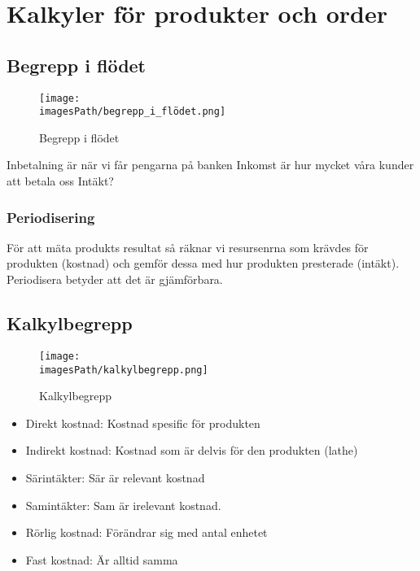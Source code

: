 \documentclass{article}
\newcommand{\imagesPath}{images}
\begin{document}
%
%
%
%

\section{Kalkyler för produkter och order}
\subsection{Begrepp i flödet}
\begin{figure}[!h]
    \centering
    \texttt{[image: \\imagesPath/begrepp\_i\_flödet.png]}
    \caption{Begrepp i flödet}
\end{figure}

Inbetalning är när vi får pengarna på banken 
Inkomst är hur mycket våra kunder att betala oss 
Intäkt?

\subsubsection{Periodisering}
För att mäta produkts resultat så räknar vi resursenrna som krävdes för produkten 
(kostnad) och gemför dessa med hur produkten presterade (intäkt).
Periodisera betyder att det är gjämförbara. 

\subsection{Kalkylbegrepp}
\begin{figure}[!h]
    \centering
    \texttt{[image: \\imagesPath/kalkylbegrepp.png]}
    \caption{Kalkylbegrepp}
\end{figure}
\begin{itemize}
    \item Direkt kostnad: Kostnad spesific för produkten
    \item Indirekt kostnad: Kostnad som är delvis för den produkten (lathe)
    \item Särintäkter: Sär är relevant kostnad 
    \item Samintäkter: Sam är irelevant kostnad.  
    \item Rörlig kostnad: Förändrar sig med antal enhetet
    \item Fast kostnad: Är alltid samma
\end{itemize}
\end{document}
